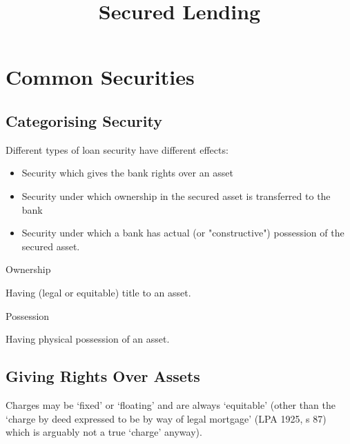 \documentclass[
]{article}
\title{Secured Lending}
\author{}
\date{}
\providecommand{\tightlist}{%
  \setlength{\itemsep}{0pt}\setlength{\parskip}{0pt}}
\newenvironment{env-8872a5c8-2356-4b38-87ff-b8a967f137b3}
{
    \savenotes\tcolorbox[blanker,breakable,left=5pt,borderline west={2pt}{-4pt}{yellow}]
}
{
    \endtcolorbox\spewnotes
}
\begin{document}
\maketitle

{
\setcounter{tocdepth}{3}
\tableofcontents
}
\hypertarget{common-securities}{%
\section{Common Securities}\label{common-securities}}

\hypertarget{categorising-security}{%
\subsection{Categorising Security}\label{categorising-security}}

Different types of loan security have different effects:

\begin{itemize}
\tightlist
\item
  Security which gives the bank rights over an asset
\item
  Security under which ownership in the secured asset is transferred to
  the bank
\item
  Security under which a bank has actual (or "constructive") possession
  of the secured asset.
\end{itemize}

\begin{env-8872a5c8-2356-4b38-87ff-b8a967f137b3}

Ownership

Having (legal or equitable) title to an asset.

\end{env-8872a5c8-2356-4b38-87ff-b8a967f137b3}

\begin{env-8872a5c8-2356-4b38-87ff-b8a967f137b3}

Possession

Having physical possession of an asset.

\end{env-8872a5c8-2356-4b38-87ff-b8a967f137b3}

\hypertarget{giving-rights-over-assets}{%
\subsection{Giving Rights Over Assets}\label{giving-rights-over-assets}}

Charges may be `fixed' or `floating' and are always `equitable' (other
than the `charge by deed expressed to be by way of legal mortgage' (LPA
1925, s 87) which is arguably not a true `charge' anyway).
\end{document}
